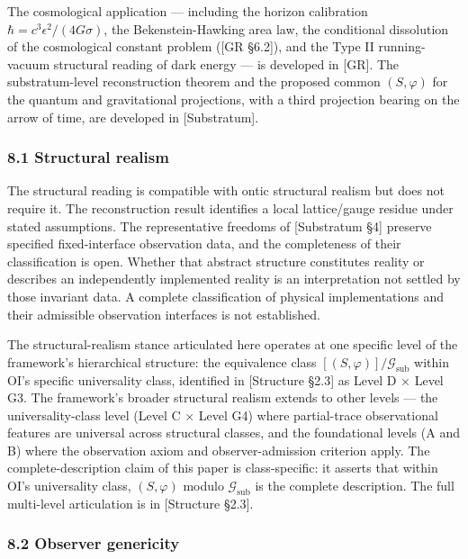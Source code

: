 \documentclass[
]{article}
\begin{document}
The cosmological application --- including the horizon calibration
\(\hbar = c^3\epsilon^2/(4G\sigma)\), the Bekenstein-Hawking area law,
the conditional dissolution of the cosmological constant problem ({[}GR
§6.2{]}), and the Type II running-vacuum structural reading of dark
energy --- is developed in {[}GR{]}. The substratum-level reconstruction
theorem and the proposed common \((S,\varphi)\) for the quantum and
gravitational projections, with a third projection bearing on the arrow
of time, are developed in {[}Substratum{]}.

\hypertarget{structural-realism}{%
\subsubsection{8.1 Structural realism}\label{structural-realism}}

The structural reading is compatible with ontic structural realism but
does not require it. The reconstruction result identifies a local
lattice/gauge residue under stated assumptions. The representative
freedoms of {[}Substratum §4{]} preserve specified fixed-interface
observation data, and the completeness of their classification is open.
Whether that abstract structure constitutes reality or describes an
independently implemented reality is an interpretation not settled by
those invariant data. A complete classification of physical
implementations and their admissible observation interfaces is not
established.

The structural-realism stance articulated here operates at one specific
level of the framework's hierarchical structure: the equivalence class
\([(S, \varphi)]/\mathcal{G}_{\text{sub}}\) within OI's specific
universality class, identified in {[}Structure §2.3{]} as Level D ×
Level G3. The framework's broader structural realism extends to other
levels --- the universality-class level (Level C × Level G4) where
partial-trace observational features are universal across structural
classes, and the foundational levels (A and B) where the observation
axiom and observer-admission criterion apply. The complete-description
claim of this paper is class-specific: it asserts that within OI's
universality class, \((S, \varphi)\) modulo \(\mathcal{G}_{\text{sub}}\)
is the complete description. The full multi-level articulation is in
{[}Structure §2.3{]}.

\hypertarget{observer-genericity}{%
\subsubsection{8.2 Observer genericity}\label{observer-genericity}}
\end{document}
